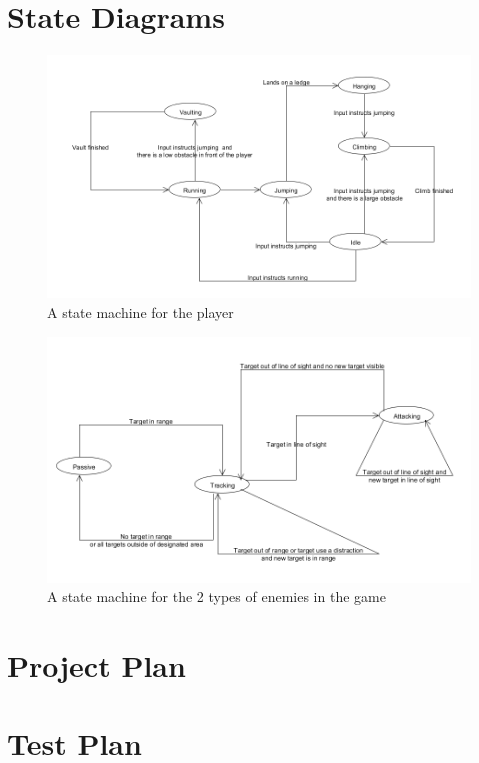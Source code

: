 \documentclass[a4paper,10pt]{article}
\begin{document}
\section{State Diagrams}
\begin{figure}[H]
	\begin{center}
		\includegraphics[scale=0.5]{images/PlayerStateMachine.png}
		\caption{A state machine for the player}
	\end{center}
\end{figure}
\begin{figure}[H]
	\begin{center}
		\includegraphics[scale=0.5]{images/EnemyStateMachine.png}
		\caption{A state machine for the 2 types of enemies in the game}
	\end{center}
\end{figure}

\section{Project Plan}

\section{Test Plan}
\end{document}

